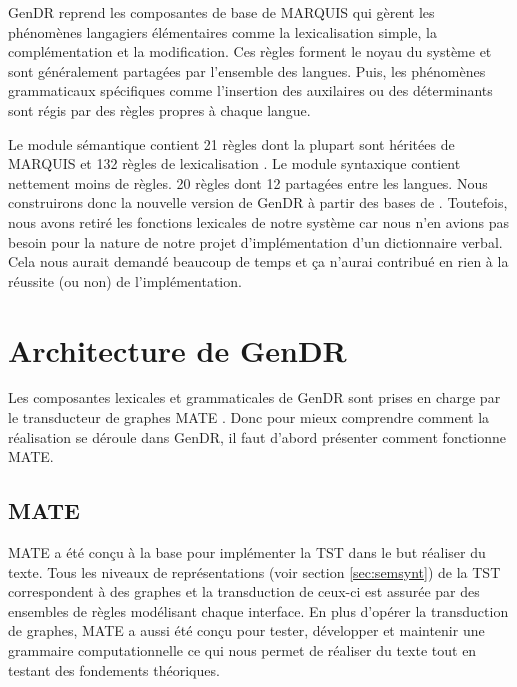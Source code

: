 GenDR reprend les composantes de base de MARQUIS qui gèrent les phénomènes langagiers élémentaires comme la  lexicalisation simple, la complémentation et la modification. Ces règles forment le noyau du système et sont généralement partagées par l'ensemble des langues. Puis, les phénomènes grammaticaux spécifiques comme l'insertion des auxilaires ou des déterminants sont régis par des règles propres à chaque langue.

Le module sémantique contient 21 règles dont la plupart sont héritées de MARQUIS et 132 règles de lexicalisation \citep{LambreyImplementationcollocationspour2017}. Le module syntaxique contient nettement moins de règles. 20 règles dont 12 partagées entre les langues. Nous construirons donc la nouvelle version de GenDR à partir des bases de \cite{LambreyImplementationcollocationspour2017, lareau18,dubinskaite17}. Toutefois, nous avons retiré les fonctions lexicales de notre système car nous n'en avions pas besoin pour la nature de notre projet d'implémentation d'un dictionnaire verbal. Cela nous aurait demandé beaucoup de temps et ça n'aurai contribué en rien à la réussite (ou non) de l'implémentation.

\section{Architecture de GenDR}

Les composantes lexicales et grammaticales de GenDR sont prises en charge par le transducteur de graphes MATE \citep{BohnetDevelopmentEnvironmentMTTbased2000,BOHNET10,bohnet07}. Donc pour mieux comprendre comment la réalisation se déroule dans GenDR, il faut d'abord présenter comment fonctionne MATE.

\subsection{MATE}
MATE a été conçu à la base pour implémenter la \ac{TST} dans le but réaliser du texte. Tous les niveaux de représentations (voir section \ref{sec:semsynt}) de la \ac{TST} correspondent à des graphes et la transduction de ceux-ci est assurée par des ensembles de règles modélisant chaque interface. En plus d'opérer la transduction de graphes, MATE a aussi été conçu pour tester, développer et maintenir une grammaire computationnelle ce qui nous permet de réaliser du texte tout en testant des fondements théoriques.

